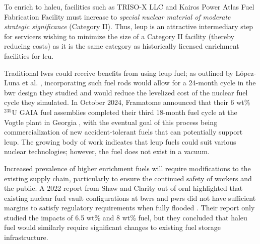 To enrich to \gls{haleu}, facilities such as TRISO-X LLC and Kairos Power Atlas Fuel Fabrication Facility must increase to \textit{special nuclear material of moderate strategic significance} (Category II). Thus, \gls{leup} is an attractive intermediary step for servicers wishing to minimize the size of a Category II facility (thereby reducing costs) as it is the same category as historically licensed enrichment facilities for \gls{leu}.

Traditional \glspl{lwr} could receive benefits from using \gls{leup} fuel; as outlined by L\'{o}pez-Luna et al. \cite{24_month_cycle_bwr}, incorporating such fuel rods would allow for a 24-month cycle in the \gls{bwr} design they studied and would reduce the levelized cost of the nuclear fuel cycle they simulated. In October 2024, Framatome announced that their 6 wt$\%$ $^{235}$U GAIA fuel assemblies completed their third 18-month fuel cycle at the Vogtle plant in Georgia \cite{framatome_press_2024}, with the eventual goal of this process being commercialization of new accident-tolerant fuels that can potentially support \gls{leup}. The growing body of work indicates that \gls{leup} fuels could suit various nuclear technologies; however, the fuel does not exist in a vacuum.

Increased prevalence of higher enrichment fuels will require modifications to the existing supply chain, particularly to ensure the continued safety of workers and the public. A 2022 report from Shaw and Clarity out of \gls{ornl} highlighted that existing nuclear fuel vault configurations at \glspl{bwr} and \glspl{pwr} did not have sufficient margins to satisfy regulatory requirements when fully flooded \cite{leup_atf_storage_impacts}. Their report only studied the impacts of 6.5 wt$\%$ and 8 wt$\%$ fuel, but they concluded that \gls{haleu} fuel would similarly require significant changes to existing fuel storage infrastructure.